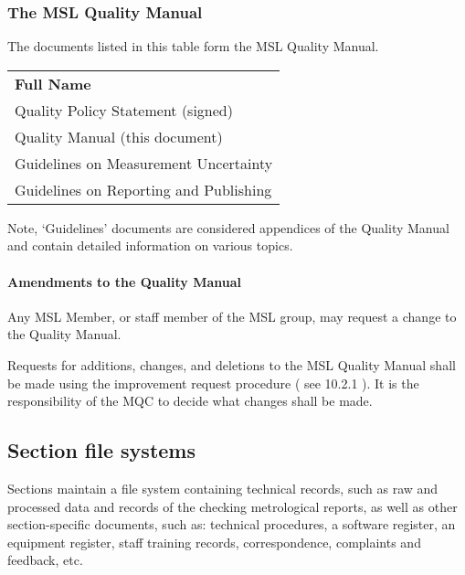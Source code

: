 \subsubsection{The MSL Quality Manual}
The documents listed in this table form the MSL Quality Manual. 
{\renewcommand*{\arraystretch}{1.4}
\begin{longtable}{p{25em}}
	\rowcolor[rgb]{ 0,  0,  0} 
	\textcolor[rgb]{ 1,  1,  1}{\textbf{Full Name}} \\
	
Quality Policy Statement (signed) \\

Quality Manual (this document) \\

Guidelines on Measurement Uncertainty \\

Guidelines on Reporting and Publishing \\
\bottomrule
\end{longtable}
}%

Note, `Guidelines' documents are considered appendices of the Quality Manual and contain detailed information on various topics. 

\paragraph{Amendments to the Quality Manual}
Any MSL Member, or staff member of the MSL group, may request a change to the Quality Manual. 

Requests for additions, changes, and deletions to the MSL Quality Manual shall be made using the improvement request procedure ( see 10.2.1 ).
It is the responsibility of the MQC to decide what changes shall be made.

\subsection{Section file systems}
\label{ss:section_file_systems}
Sections maintain a file system containing technical records, such as raw and processed data and records of the checking metrological reports, as well as other section-specific documents, such as: technical procedures, a software register, an equipment register, staff training records, correspondence, complaints and feedback, etc. 

